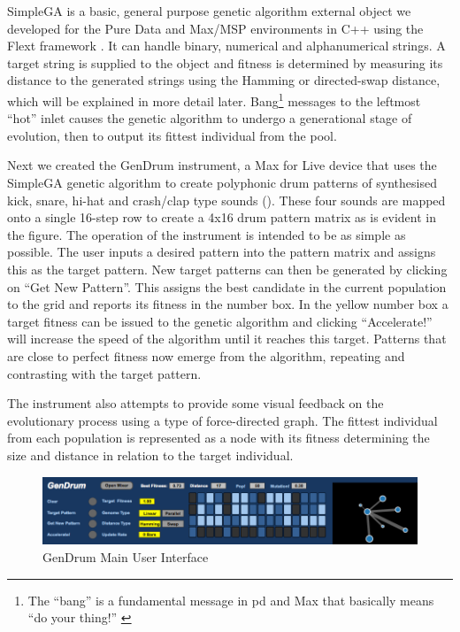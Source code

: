 SimpleGA is a basic, general purpose genetic algorithm external object we developed for the Pure Data \citep{Puckette1997} and Max/MSP environments in C++ using the Flext framework \citep{Grill} . It can handle binary, numerical and alphanumerical strings. A target string is supplied to the object and fitness is determined by measuring its distance to the generated strings using the Hamming or directed-swap distance, which will be explained in more detail later. Bang\footnote{The ``bang'' is a fundamental message in \acrshort{pd} and Max that basically means ``do your thing!'' \citep{winkler2001composing}} messages to the leftmost ``hot'' inlet causes the genetic algorithm to undergo a generational stage of evolution, then to output its fittest individual from the pool.

Next we created the GenDrum instrument, a Max for Live device that uses the SimpleGA genetic algorithm to create polyphonic drum patterns of synthesised kick, snare, hi-hat and crash/clap type sounds (). These four sounds are mapped onto a single 16-step row to create a 4x16 drum pattern matrix as is evident in the figure. The operation of the instrument is intended to be as simple as possible. The user inputs a desired pattern into the pattern matrix and assigns this as the target pattern. New target patterns can then be generated by clicking on ``Get New Pattern''. This assigns the best candidate in the current population to the grid and reports its fitness in the number box. In the yellow number box a target fitness can be issued to the genetic algorithm and clicking ``Accelerate!'' will increase the speed of the algorithm until it reaches this target. Patterns that are close to perfect fitness now emerge from the algorithm, repeating and contrasting with the target pattern.

The instrument also attempts to provide some visual feedback on the evolutionary process using a type of force-directed graph. The fittest individual from each population is represented as a node with its fitness determining the size and distance in relation to the target individual.

\begin{figure}
	\begin{center}
		\includegraphics[width=\figSizeHundred]{ch03_symbolic/figures/gendrum.png}
	\end{center}
	\caption[GenDrum Main User Interface]{GenDrum Main User Interface}
	\label{fig:gendrum}
\end{figure}

